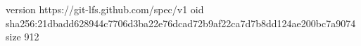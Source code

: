 version https://git-lfs.github.com/spec/v1
oid sha256:21dbadd628944c7706d3ba22e76dcad72b9af22ca7d7b8dd124ae200bc7a9074
size 912
